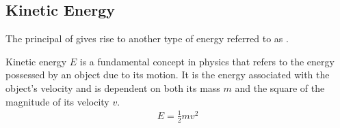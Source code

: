 \subsection{Kinetic Energy}

The principal of  gives rise to another type of energy referred to as .

\begin{defn}
	Kinetic energy $E$ is a fundamental concept in physics that refers to the energy possessed by an object due to its motion. It is the energy associated with the object's velocity and is dependent on both its mass $m$ and the square of the magnitude of its velocity $v$. 
	\begin{align}
		E = \frac{1}{2}mv^2
	\end{align}
\end{defn} 